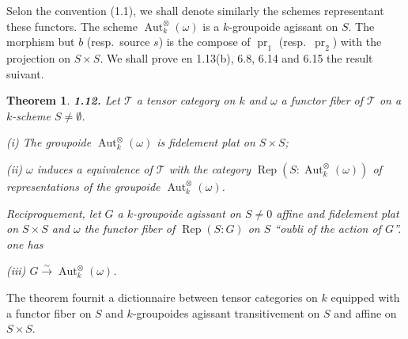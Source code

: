 \documentclass[12pt,a4paper]{article}
\theoremstyle{plain}
\newtheorem{theorem}{Theorem}[section]
\theoremstyle{definition}
\theoremstyle{remark}
\DeclareMathOperator{\Aut}{Aut}
\DeclareMathOperator{\pr}{pr}
\DeclareMathOperator{\Rep}{Rep}
\begin{document}
Selon the convention (1.1), we shall denote similarly the schemes representant these functors. The scheme $\Aut^\otimes_k(\omega)$ is a $k$-groupoide agissant on $S$. The morphism but $b$ (resp.~source $s$) is the compose of $\pr_1$ (resp.~$\pr_2$) with the projection on $S \times S$. We shall prove en 1.13(b), 6.8, 6.14 and 6.15 the result suivant.

\begin{theorem}
\textbf{1.12.} Let $\mathcal{T}$ a tensor category on $k$ and $\omega$ a functor fiber of $\mathcal{T}$ on a $k$-scheme $S \neq \emptyset$.

\emph{(i)} The groupoide $\Aut^\otimes_k(\omega)$ is fidelement plat on $S \times S$;

\emph{(ii)} $\omega$ induces a equivalence of $\mathcal{T}$ with the category $\Rep(S:\Aut^\otimes_k(\omega))$ of representations of the groupoide $\Aut^\otimes_k(\omega)$.

Reciproquement, let $G$ a $k$-groupoide agissant on $S \neq 0$ affine and fidelement plat on $S \times S$ and $\omega$ the functor fiber of $\Rep(S:G)$ on $S$ ``oubli of the action of $G$''. one has

\emph{(iii)} $G \xrightarrow{\sim} \Aut^\otimes_k(\omega)$.
\end{theorem}

The theorem fournit a dictionnaire between tensor categories on $k$ equipped with a functor fiber on $S$ and $k$-groupoides agissant transitivement on $S$ and affine on $S \times S$.
\end{document}
